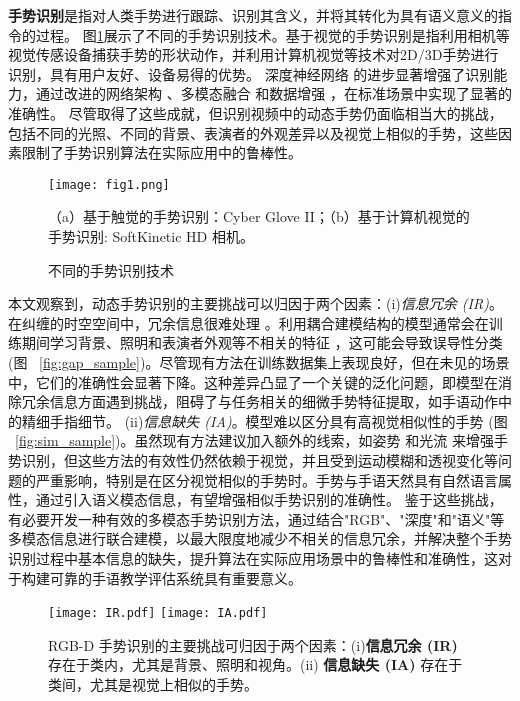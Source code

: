 \textbf{手势识别}是指对人类手势进行跟踪、识别其含义，并将其转化为具有语义意义的指令的过程\cite{rautaray2015vision}。
图\ref{fig:gesture_techniques}展示了不同的手势识别技术。基于视觉的手势识别是指利用相机等视觉传感设备捕获手势的形状动作，并利用计算机视觉等技术对2D/3D手势进行识别，具有用户友好、设备易得的优势。
深度神经网络 \cite{zhou2023unified,li2021trear} 的进步显著增强了识别能力，通过改进的网络架构 \cite{zhu2019redundancy,zhu2018continuous,zhou2022decoupling}、多模态融合 \cite{li2021trear,narayana2018focus,yu2021searching} 和数据增强 \cite{li2021trear,zuo2023natural}，在标准场景中实现了显著的准确性。
尽管取得了这些成就，但识别视频中的动态手势仍面临相当大的挑战，包括不同的光照、不同的背景、表演者的外观差异以及视觉上相似的手势，这些因素限制了手势识别算法在实际应用中的鲁棒性。
\begin{figure}
  \centering
  \texttt{[image: fig1.png]}
  \caption*{（a）基于触觉的手势识别：Cyber Glove II\cite{kevin2004}；（b）基于计算机视觉的手势识别: SoftKinetic HD 相机\cite{iisuSDK2012}。}
  \caption{不同的手势识别技术}
  \label{fig:gesture_techniques}
\end{figure}

本文观察到，动态手势识别的主要挑战可以归因于两个因素：(i)\textit{信息冗余 (IR)}。
在纠缠的时空空间中，冗余信息很难处理 \cite{zhou2023unified, LI2024110536}。利用耦合建模结构的模型通常会在训练期间学习背景、照明和表演者外观等不相关的特征 \cite{zhou2023unified}，这可能会导致误导性分类 (图 ~\ref{fig:gap_sample})。尽管现有方法在训练数据集上表现良好，但在未见的场景中，它们的准确性会显著下降。这种差异凸显了一个关键的泛化问题，即模型在消除冗余信息方面遇到挑战，阻碍了与任务相关的细微手势特征提取，如手语动作中的精细手指细节。
(ii)\textit{信息缺失 (IA)}。模型难以区分具有高视觉相似性的手势 (图 ~\ref{fig:sim_sample})。虽然现有方法建议加入额外的线索，如姿势 \cite{wan2016chalearn,zuo2023natural} 和光流 \cite{narayana2018focus} 来增强手势识别，但这些方法的有效性仍然依赖于视觉，并且受到运动模糊和透视变化等问题的严重影响，特别是在区分视觉相似的手势时。手势与手语天然具有自然语言属性，通过引入语义模态信息，有望增强相似手势识别的准确性。
鉴于这些挑战，有必要开发一种有效的多模态手势识别方法，通过结合"RGB"、"深度"和"语义"等多模态信息进行联合建模，以最大限度地减少不相关的信息冗余，并解决整个手势识别过程中基本信息的缺失，提升算法在实际应用场景中的鲁棒性和准确性，这对于构建可靠的手语教学评估系统具有重要意义。

\begin{figure}[tb]
  \centering
  {\texttt{[image: IR.pdf]}}
  {\texttt{[image: IA.pdf]}}
  \caption{RGB-D 手势识别的主要挑战可归因于两个因素：(i)\textbf{信息冗余 (IR)} 存在于类内，尤其是背景、照明和视角。(ii) \textbf{信息缺失 (IA)} 存在于类间，尤其是视觉上相似的手势。}
  \label{fig:samples}
  \end{figure}


